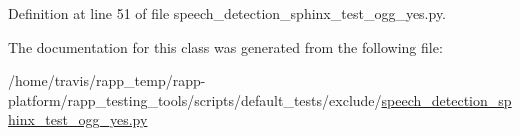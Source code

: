 Definition at line 51 of file speech\-\_\-detection\-\_\-sphinx\-\_\-test\-\_\-ogg\-\_\-yes.\-py.



The documentation for this class was generated from the following file\-:\begin{DoxyCompactItemize}
\item 
/home/travis/rapp\-\_\-temp/rapp-\/platform/rapp\-\_\-testing\-\_\-tools/scripts/default\-\_\-tests/exclude/\hyperlink{speech__detection__sphinx__test__ogg__yes_8py}{speech\-\_\-detection\-\_\-sphinx\-\_\-test\-\_\-ogg\-\_\-yes.\-py}\end{DoxyCompactItemize}
